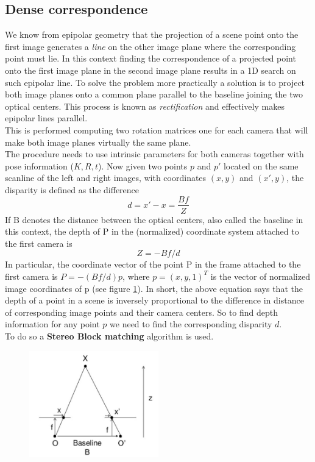 \documentclass[12pt]{amsart}
\begin{document}
\subsection{Dense correspondence}
We know from epipolar geometry that the projection of a scene point onto the first image generates a \textit{line} on the other image plane where the corresponding point must lie.
In this context finding the correspondence of a projected point onto the first image plane in the second image plane results in a 1D search on such epipolar line.
To solve the problem more practically a solution is to project both image planes onto a common plane parallel to the baseline joining the two optical centers. This process is known as 
\textit{rectification} and effectively makes epipolar lines parallel.\\
This is performed computing two rotation matrices one for each camera that will make both image planes virtually the same plane.\\ 
The procedure needs to use intrinsic parameters for both cameras together with pose information (\(K, R, t\)).
Now given two points \(p\) and \(p'\) located on the same scanline of the left and right images, with coordinates \((x, y)\) and \((x', y)\), 
the disparity is defined as the difference \[d = x' - x = \frac{Bf}{Z} \]
If B denotes the distance between the optical centers, also called the baseline in this context, 
the depth of P in the (normalized) coordinate system attached to the first camera is \[Z = -Bf/d\] 
In particular, the coordinate vector of the point P in the frame attached to the first camera is 
\(P = -(Bf/d)p\), where \(p = (x,y,1)^T\) is the vector of normalized image coordinates of p (see figure \ref{fig:disparity}).
In short, the above equation says that the depth of a point in a scene is inversely proportional to the difference in distance of corresponding image points and their camera centers. 
So to find depth information for any point \(p\) we need to find the corresponding disparity \(d\).\\ 
To do so a \textbf{Stereo Block matching} algorithm is used.
\begin{figure}[h]
    \includegraphics[width=0.5\textwidth]{disparity}
    \label{fig:disparity}
\end{figure}
\end{document}

